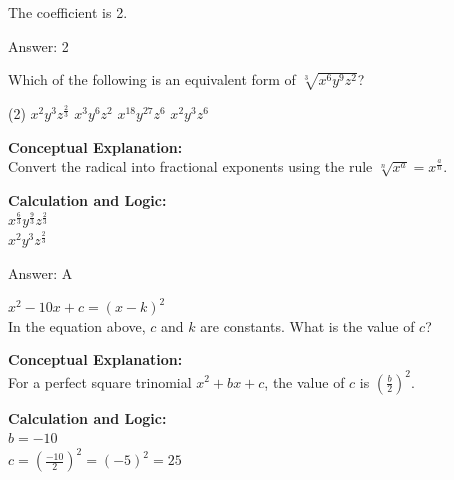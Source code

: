 \documentclass[11pt,paper=a4,answers]{exam}
\begin{document}
\begin{questions}
\begin{solution}
The coefficient is 2.

\vspace{25pt}

Answer: \colorbox{yellow!100}{2}
\end{solution}

\vspace{40pt}

\question
Which of the following is an equivalent form of $\sqrt[3]{x^6 y^9 z^2}$?
\begin{tasks}(2)
    \task $x^2 y^3 z^{\frac{2}{3}}$
    \task $x^3 y^6 z^2$
    \task $x^{18} y^{27} z^6$
    \task $x^2 y^3 z^6$
\end{tasks}

\begin{solution}
\textbf{Conceptual Explanation:} \\
Convert the radical into fractional exponents using the rule $\sqrt[n]{x^a} = x^{\frac{a}{n}}$.

\vspace{20pt}

\textbf{Calculation and Logic:} \\
$x^{\frac{6}{3}} y^{\frac{9}{3}} z^{\frac{2}{3}}$ \\
$x^2 y^3 z^{\frac{2}{3}}$

\vspace{25pt}

Answer: \colorbox{yellow!100}{A}
\end{solution}

\vspace{40pt}

\question
$x^2 - 10x + c = (x - k)^2$ \\
In the equation above, $c$ and $k$ are constants. What is the value of $c$?

\begin{solution}
\textbf{Conceptual Explanation:} \\
For a perfect square trinomial $x^2 + bx + c$, the value of $c$ is $(\frac{b}{2})^2$.

\vspace{20pt}

\textbf{Calculation and Logic:} \\
$b = -10$ \\
$c = (\frac{-10}{2})^2 = (-5)^2 = 25$

\vspace{25pt}


\end{solution}
\end{questions}
\end{document}
